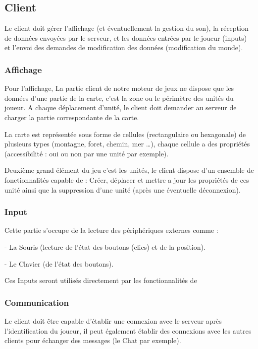 \documentclass[a4paper,10pt]{report}
\begin{document}
    \subsection{Client}

      Le client doit gérer l'affichage (et éventuellement la gestion du son), la réception de données envoyées par le serveur, et les données entrées par le joueur (inputs) et l'envoi des demandes de modification des données (modification du monde).

      \subsubsection{Affichage}

	Pour l’affichage, La partie client de notre moteur de jeux ne dispose que les données d’une partie de la carte, c’est la zone ou le périmètre des unités du joueur. A chaque déplacement d’unité, le client doit demander au serveur de charger la partie  correspondante de la carte.

	La carte est représentée sous forme de cellules (rectangulaire ou hexagonale) de plusieurs types (montagne, foret, chemin, mer …), chaque cellule a des propriétés (accessibilité : oui ou non par une unité par exemple).

	Deuxième grand élément du jeu c’est les unités, le client dispose d’un ensemble de fonctionnalités capable de : Créer, déplacer et mettre a jour les propriétés de ces unité ainsi que la suppression d’une unité (après une éventuelle déconnexion).

      \subsubsection{Input}

	Cette partie s'occupe de la lecture des périphériques externes comme :

	- La Souris (lecture de l'état des boutons (clics) et de la position).

	- Le Clavier (de l'état des boutons).

	Ces Inputs seront utilisés directement par les fonctionnalités de

      \subsubsection{Communication}

	Le client doit être capable d’établir une connexion avec le serveur après l’identification du joueur, il peut également établir des connexions avec les autres clients pour échanger des messages (le Chat par exemple).
\end{document}
